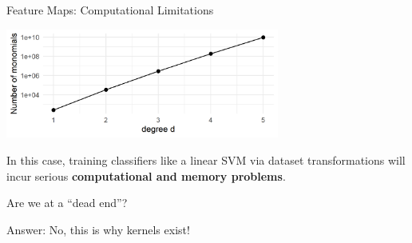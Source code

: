 \begin{vbframe}{Feature Maps: Computational Limitations}
\begin{center}
\includegraphics[width = 9cm ]{figure/n_monomials.png}
\end{center}

In this case, training classifiers like a linear SVM via dataset transformations will incur serious \textbf{computational and memory problems}.

\vspace*{0.2cm} 

Are we at a \enquote{dead end}?

Answer: No, this is why kernels exist!

\end{vbframe}

\endlecture

